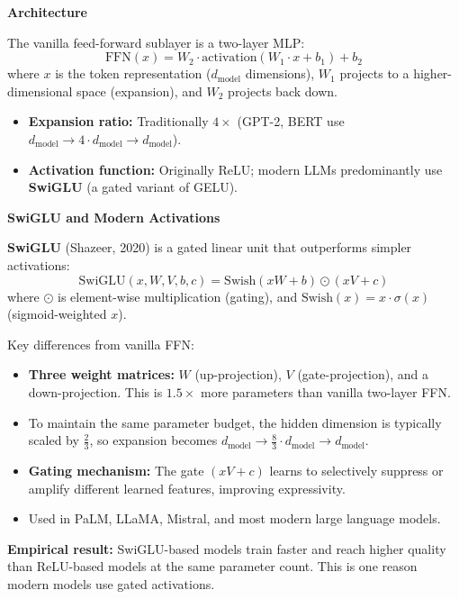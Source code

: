 \begin{notebox}
\textbf{Architecture}

The vanilla feed-forward sublayer is a two-layer MLP:
\[
  \text{FFN}(x) = W_2 \cdot \text{activation}(W_1 \cdot x + b_1) + b_2
\]
where $x$ is the token representation ($d_{\text{model}}$ dimensions), $W_1$ projects to a higher-dimensional space (expansion), and $W_2$ projects back down.

\begin{itemize}
  \item \textbf{Expansion ratio:} Traditionally $4\times$ (GPT-2, BERT use $d_{\text{model}} \to 4 \cdot d_{\text{model}} \to d_{\text{model}}$).
  \item \textbf{Activation function:} Originally ReLU; modern LLMs predominantly use \textbf{SwiGLU} (a gated variant of GELU).
\end{itemize}
\end{notebox}

\begin{notebox}
\textbf{SwiGLU and Modern Activations}

\textbf{SwiGLU} (Shazeer, 2020) is a gated linear unit that outperforms simpler activations:
\[
  \text{SwiGLU}(x, W, V, b, c) = \text{Swish}(x W + b) \odot (x V + c)
\]
where $\odot$ is element-wise multiplication (gating), and $\text{Swish}(x) = x \cdot \sigma(x)$ (sigmoid-weighted $x$).

Key differences from vanilla FFN:
\begin{itemize}
  \item \textbf{Three weight matrices:} $W$ (up-projection), $V$ (gate-projection), and a down-projection. This is $1.5\times$ more parameters than vanilla two-layer FFN.
  \item To maintain the same parameter budget, the hidden dimension is typically scaled by $\tfrac{2}{3}$, so expansion becomes $d_{\text{model}} \to \tfrac{8}{3} \cdot d_{\text{model}} \to d_{\text{model}}$.
  \item \textbf{Gating mechanism:} The gate $(xV+c)$ learns to selectively suppress or amplify different learned features, improving expressivity.
  \item Used in PaLM, LLaMA, Mistral, and most modern large language models.
\end{itemize}

\begin{warnbox}
\textbf{Empirical result:} SwiGLU-based models train faster and reach higher quality than ReLU-based models at the same parameter count. This is one reason modern models use gated activations.
\end{warnbox}
\end{notebox}

